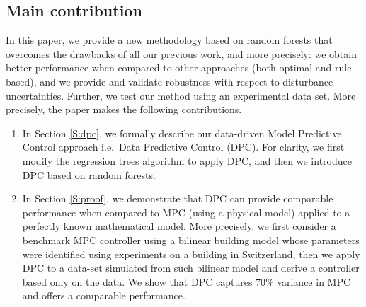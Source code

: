 \textcolor[rgb]{0,0,1}{
\subsection{Main contribution}
In this paper, we provide a new methodology based on random forests that overcomes the drawbacks of all our previous work, and more precisely: we obtain better performance when compared to other approaches (both optimal and rule-based), and we provide and validate robustness with respect to disturbance uncertainties.
Further, we test our method using an experimental data set. 
More precisely, the paper makes the following contributions.
\begin{enumerate}
	\item In Section \ref{S:dpc}, we formally describe our data-driven Model Predictive Control approach i.e.~Data Predictive Control (DPC). For clarity, we first modify the regression trees algorithm to apply DPC, and then we introduce DPC based on random forests.
	\item In Section \ref{S:proof}, we demonstrate that DPC can provide comparable performance when compared to MPC (using a physical model) applied to a perfectly known mathematical model. More precisely, we first consider a benchmark MPC controller using a bilinear building model whose parameters were identified using experiments on a building in Switzerland, then we apply DPC to a data-set simulated from such bilinear model and derive a controller based only on the data. We show that DPC captures 70\% variance in MPC and offers a comparable performance.

\end{enumerate}}
